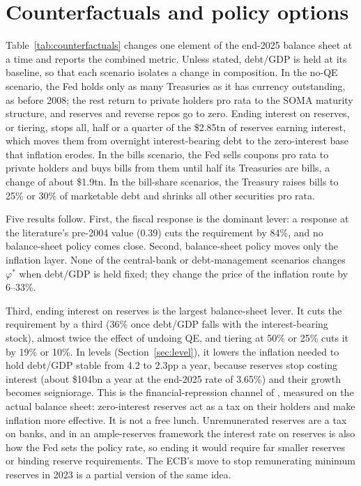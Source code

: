 \section{Counterfactuals and policy options}\label{sec:policy}

Table~\ref{tab:counterfactuals} changes one element of the end-2025 balance sheet at a time and reports the combined metric. Unless stated, debt/GDP is held at its baseline, so that each scenario isolates a change in composition. In the no-QE scenario, the Fed holds only as many Treasuries as it has currency outstanding, as before 2008; the rest return to private holders pro rata to the SOMA maturity structure, and reserves and reverse repos go to zero. Ending interest on reserves, or tiering, stops all, half or a quarter of the \$2.85tn of reserves earning interest, which moves them from overnight interest-bearing debt to the zero-interest base that inflation erodes. In the bills scenario, the Fed sells coupons pro rata to private holders and buys bills from them until half its Treasuries are bills, a change of about \$1.9tn. In the bill-share scenarios, the Treasury raises bills to 25\% or 30\% of marketable debt and shrinks all other securities pro rata.



Five results follow. First, the fiscal response is the dominant lever: a response at the literature's pre-2004 value (0.39) cuts the requirement by 84\%, and no balance-sheet policy comes close. Second, balance-sheet policy moves only the inflation layer. None of the central-bank or debt-management scenarios changes $\varphi^*$ when debt/GDP is held fixed; they change the price of the inflation route by 6--33\%.

Third, ending interest on reserves is the largest balance-sheet lever. It cuts the requirement by a third (36\% once debt/GDP falls with the interest-bearing stock), almost twice the effect of undoing QE, and tiering at 50\% or 25\% cuts it by 19\% or 10\%. In levels (Section~\ref{sec:level}), it lowers the inflation needed to hold debt/GDP stable from 4.2 to 2.3pp a year, because reserves stop costing interest (about \$104bn a year at the end-2025 rate of 3.65\%) and their growth becomes seigniorage. This is the financial-repression channel of \citet{hilscher2022}, measured on the actual balance sheet: zero-interest reserves act as a tax on their holders and make inflation more effective. It is not a free lunch. Unremunerated reserves are a tax on banks, and in an ample-reserves framework the interest rate on reserves is also how the Fed sets the policy rate, so ending it would require far smaller reserves or binding reserve requirements. The ECB's move to stop remunerating minimum reserves in 2023 is a partial version of the same idea.

